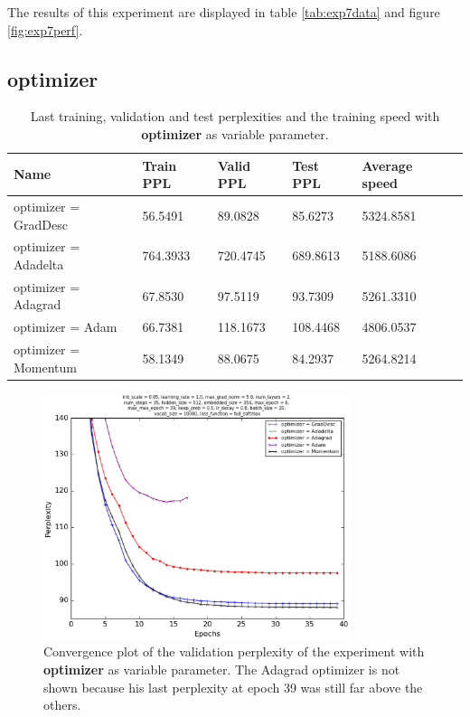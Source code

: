 \documentclass[10pt,a4paper,titlepage]{article}
\begin{document}
The results of this experiment are displayed in table \ref{tab:exp7data} and figure \ref{fig:exp7perf}.

\newpage

\subsection{optimizer}

\begin{table}[H]
\centering
\caption{Last training, validation and test perplexities and the training speed with \textbf{optimizer} as variable parameter.}
\label{tab:exp8data}
\begin{tabular}{|l|l|l|l|l|l|}
\hline
{\small Name} & {\small Train PPL} & {\small Valid PPL} & {\small Test PPL} & {\small Average speed}\\ \hline
optimizer = GradDesc                          & 56.5491    & 89.0828    & 85.6273    & 5324.8581  \\ \hline
optimizer = Adadelta                          & 764.3933   & 720.4745   & 689.8613   & 5188.6086  \\ \hline
optimizer = Adagrad                           & 67.8530    & 97.5119    & 93.7309    & 5261.3310  \\ \hline
optimizer = Adam                              & 66.7381    & 118.1673   & 108.4468   & 4806.0537  \\ \hline
optimizer = Momentum                          & 58.1349    & 88.0675    & 84.2937    & 5264.8214  \\ \hline
\end{tabular}
\end{table}

\begin{figure}[H]
	\begin{center}
		\includegraphics[width=0.80\textwidth]{Figures/optimizerperf.eps}
		\caption{Convergence plot of the validation perplexity of the experiment with \textbf{optimizer} as variable parameter. The Adagrad optimizer is not shown because his last perplexity at epoch 39 was still far above the others.}
		\label{fig:exp8perf}
	\end{center}	
\end{figure}
\end{document}
